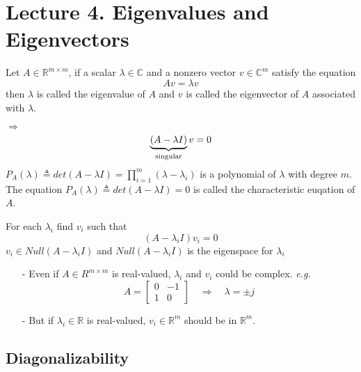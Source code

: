 \section{Lecture 4. Eigenvalues and Eigenvectors}
\begin{multicols}{2}
\begin{definition}
    Let $A\in\mathbb{R}^{m\times m}$, if a scalar $\lambda\in\mathbb{C}$ and a nonzero vector $v\in\mathbb{C}^m$ satisfy the equation 
    \[
        Av=\lambda v
    \]
    then $\lambda$ is called the eigenvalue of $A$ and $v$ is called the eigenvector of $A$ associated with $\lambda$.
\end{definition}
$\Longrightarrow$ 
\[
    \underbrace{(A-\lambda I)}_{\text{\rm singular}}v = 0
\]
$P_A(\lambda)\triangleq det(A-\lambda I)=\prod_{i=1}^m(\lambda-\lambda_i)$ is a polynomial of $\lambda$ with degree $m$.
The equation $P_A(\lambda)\triangleq det(A-\lambda I)=0$ is called the characteristic euqation of $A$.

For each $\lambda_i$ find $v_i$ such that 
\[
    (A-\lambda_i I)v_i = 0
\]
$v_i\in Null(A-\lambda_i I)$ and $Null(A-\lambda_i I)$ is the eigenspace for $\lambda_i$
\begin{enumerate}
    \item [-] Even if $A\in R^{m\times m}$ is real-valued, $\lambda_i$ and $v_i$ could be complex.
    \emph{e.g.} 
    \[
        A=\begin{bmatrix}
            0& -1 \\ 1 & 0
        \end{bmatrix}\quad \Longrightarrow \quad \lambda = \pm j
    \]
    \item [-] But if $\lambda_i\in\mathbb{R}$ is real-valued, $v_i\in\mathbb{R}^m$ should be in $\mathbb{R}^m$.
\end{enumerate}

\subsection{Diagonalizability}

\end{multicols}
